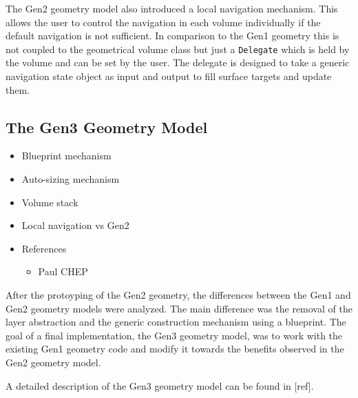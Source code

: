 The Gen2 geometry model also introduced a local navigation mechanism. This allows the user to control the navigation in each volume individually if the default navigation is not sufficient. In comparison to the Gen1 geometry this is not coupled to the geometrical volume class but just a \texttt{Delegate} which is held by the volume and can be set by the user. The delegate is designed to take a generic navigation state object as input and output to fill surface targets and update them.

\subsection{The Gen3 Geometry Model}

\begin{itemize}
    \color{red}
    \item Blueprint mechanism
    \item Auto-sizing mechanism
    \item Volume stack
    \item Local navigation vs Gen2
    \item References
    \begin{itemize}
        \item Paul CHEP
    \end{itemize}
\end{itemize}

After the protoyping of the Gen2 geometry, the differences between the Gen1 and Gen2 geometry models were analyzed. The main difference was the removal of the layer abstraction and the generic construction mechanism using a blueprint. The goal of a final implementation, the Gen3 geometry model, was to work with the existing Gen1 geometry code and modify it towards the benefits observed in the Gen2 geometry model.

A detailed description of the Gen3 geometry model can be found in [ref].

